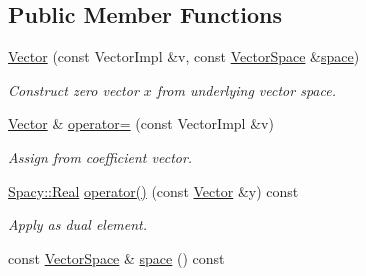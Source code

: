 \subsection*{\-Public \-Member \-Functions}
\begin{DoxyCompactItemize}
\item 
\hyperlink{classSpacy_1_1Generic_1_1Vector_a35622c4a7a184c2d6ff951bbde6a871c}{\-Vector} (const \-Vector\-Impl \&v, const \hyperlink{classSpacy_1_1VectorSpace}{\-Vector\-Space} \&\hyperlink{classSpacy_1_1VectorBase_aa999dbf9d679d895dfe04c10fbf9f5e9}{space})
\begin{DoxyCompactList}\small\item\em \-Construct zero vector $x$ from underlying vector space. \end{DoxyCompactList}\item 
\hyperlink{classSpacy_1_1Generic_1_1Vector}{\-Vector} \& \hyperlink{classSpacy_1_1Generic_1_1Vector_acec9492900de215a4e3d4b16129fbadd}{operator=} (const \-Vector\-Impl \&v)
\begin{DoxyCompactList}\small\item\em \-Assign from coefficient vector. \end{DoxyCompactList}\item 
\hyperlink{classSpacy_1_1Real}{\-Spacy\-::\-Real} \hyperlink{classSpacy_1_1Generic_1_1Vector_acf676aac17118e0b3b7d6b08f026d641}{operator()} (const \hyperlink{classSpacy_1_1Generic_1_1Vector}{\-Vector} \&y) const 
\begin{DoxyCompactList}\small\item\em \-Apply as dual element. \end{DoxyCompactList}\item 
\hypertarget{classSpacy_1_1VectorBase_aa999dbf9d679d895dfe04c10fbf9f5e9}{const \hyperlink{classSpacy_1_1VectorSpace}{\-Vector\-Space} \& \hyperlink{classSpacy_1_1VectorBase_aa999dbf9d679d895dfe04c10fbf9f5e9}{space} () const }\label{classSpacy_1_1VectorBase_aa999dbf9d679d895dfe04c10fbf9f5e9}


\end{DoxyCompactItemize}
